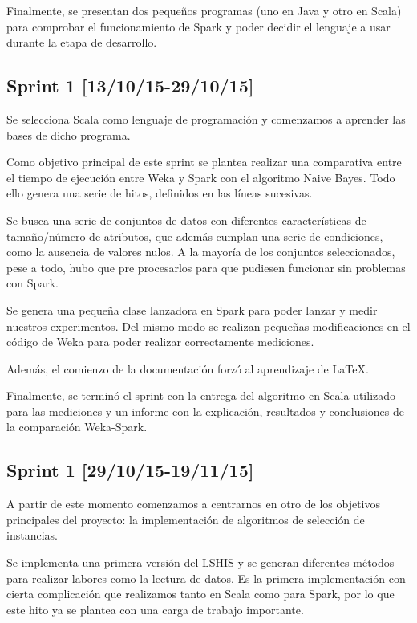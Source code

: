 Finalmente, se presentan dos pequeños programas (uno en Java y otro en Scala) para comprobar el funcionamiento de Spark y poder decidir el lenguaje a usar durante la etapa de desarrollo.

\subsection{Sprint 1 [13/10/15-29/10/15]}

Se selecciona Scala como lenguaje de programación y comenzamos a aprender las bases de dicho programa.

Como objetivo principal de este sprint se plantea realizar una comparativa entre el tiempo de ejecución entre Weka y Spark con el algoritmo Naive Bayes. Todo ello genera una serie de hitos, definidos en las líneas sucesivas.

Se busca una serie de conjuntos de datos con diferentes características de tamaño/número de atributos, que además cumplan una serie de condiciones, como la ausencia de valores nulos. A la mayoría de los conjuntos seleccionados, pese a todo, hubo que pre procesarlos para que pudiesen funcionar sin problemas con Spark.

Se genera una pequeña clase lanzadora en Spark para poder lanzar y medir nuestros experimentos. Del mismo modo se realizan pequeñas modificaciones en el código de Weka para poder realizar correctamente mediciones.

Además, el comienzo de la documentación forzó al aprendizaje de \LaTeX.

Finalmente, se terminó el sprint con la entrega del algoritmo en Scala utilizado para las mediciones y un informe con la explicación, resultados y conclusiones de la comparación Weka-Spark.

\subsection{Sprint 1 [29/10/15-19/11/15]}

A partir de este momento comenzamos a centrarnos en otro de los objetivos principales del proyecto: la implementación de algoritmos de selección de instancias.
 
Se implementa una primera versión del LSHIS y se generan diferentes métodos para realizar labores como la lectura de datos. Es la primera implementación con cierta complicación que realizamos tanto en Scala como para Spark, por lo que este hito ya se plantea con una carga de trabajo importante.


